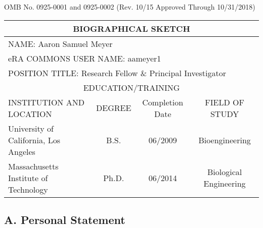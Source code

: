 \documentclass[11pt]{article}
\begin{document}
\setlength\parindent{0pt}

\renewcommand{\arraystretch}{1.2}

\begin{flushright}
\footnotesize
	OMB No. 0925-0001 and 0925-0002 (Rev. 10/15 Approved Through 10/31/2018)
\end{flushright}


\begin{tabular}{l|c|c|c}
  \hline
  \multicolumn{4}{c}{\textbf{BIOGRAPHICAL SKETCH}} \\
  \hline
  \multicolumn{4}{l}{NAME: Aaron Samuel Meyer} \\
  \hline
  \multicolumn{4}{l}{eRA COMMONS USER NAME: aameyer1} \\
  \hline
  \multicolumn{4}{l}{POSITION TITLE: Research Fellow \& Principal Investigator} \\
  \hline
  \multicolumn{4}{c}{EDUCATION/TRAINING} \\
  \hline
  INSTITUTION AND LOCATION & DEGREE & Completion Date & FIELD OF STUDY \\
  \hline
  University of California, Los Angeles & B.S. & 06/2009 & Bioengineering \\
  Massachusetts Institute of Technology & Ph.D. & 06/2014 & Biological Engineering \\
  
\end{tabular}


\vspace{20pt}

\subsection{A. Personal Statement}

\end{document}
